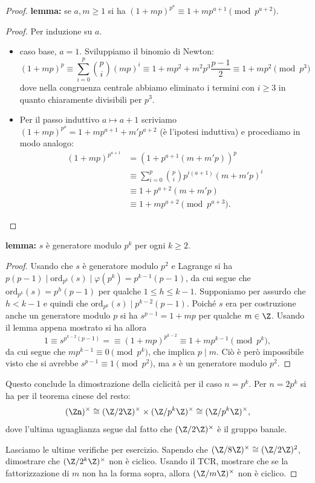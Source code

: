 \begin{proof}
    \textbf{lemma:} se $a,m \geq 1$ si ha $(1+mp)^{p^a} \equiv 1 + mp^{a+1} \pmod{p^{a+2}}$.
    \begin{proof}
        Per induzione su $a$. 
        \begin{itemize}
            \item caso base, $a=1$. Sviluppiamo il binomio di Newton:
                \[
                    (1+mp)^{p} \equiv \sum_{i=0}^{p} \binom{p}{i}(mp)^i \equiv 1 + mp^2 + m^2p^3 \frac{p-1}{2} \equiv 1 + mp^2 \pmod{p^3}
                \]
                dove nella congruenza centrale abbiamo eliminato i termini con $i \geq 3$ in quanto chiaramente divisibili per $p^3$.
            \item Per il passo induttivo $a \mapsto a+1$ scriviamo $(1+mp)^{p^a} = 1 + mp^{a+1} + m' p^{a+2}$ (è l'ipotesi induttiva) e procediamo in modo analogo:
            \begin{align*}
                (1+mp)^{p^{a+1}} &= (1 + p^{a+1}(m+m'p))^p \\
                &\equiv \sum_{i=0}^{p} \binom{p}{i} p^{i(a+1)}(m+m'p)^i \\
                &\equiv 1 + p^{a+2}(m+m'p) \\
                &\equiv 1 + mp^{a+2} \pmod{p^{a+3}}.
            \end{align*}
        \end{itemize}
    \end{proof}
    \textbf{lemma:} $s$ è generatore modulo $p^k$ per ogni $k \geq 2$.
    \begin{proof}
        Usando che $s$ è generatore modulo $p^2$ e Lagrange si ha $p(p-1)  \mid  \text{ord}_{p^k}(s)  \mid  \varphi(p^k) = p^{k-1}(p-1)$, da cui segue che $\text{ord}_{p^k}(s) = p^h(p-1)$ per qualche $1 \leq h \leq k-1$. Supponiamo per assurdo che $h < k-1$ e quindi che $\text{ord}_{p^k}(s)  \mid  p^{k-2}(p-1)$. Poiché $s$ era per costruzione anche un generatore modulo $p$ si ha $s^{p-1} = 1 + mp $ per qualche $m \in \Z$. Usando il lemma appena mostrato si ha allora \[ 1 \equiv s^{p^{k-2}(p-1)} =\equiv (1 + mp)^{p^{k-2}} \equiv 1 + mp^{k-1} \pmod{p^k}, \]
        da cui segue che $ mp^{k-1} \equiv 0\pmod{p^k}$, che implica $p  \mid  m$. Ciò è però impossibile visto che si avrebbe $s^{p-1} \equiv 1 \pmod{p^2}$, ma $s$ è un generatore modulo $p^2$. 
    \end{proof}
    Questo conclude la dimostrazione della ciclicità per il caso $n = p^k$. Per $n = 2p^k$ si ha per il teorema cinese del resto: \[(\Zn)^\times \cong (\Z/2\Z)^\times \times (\Z/p^k\Z)^\times \cong (\Z/p^k\Z)^\times,\]
    dove l'ultima uguaglianza segue dal fatto che $(\Z/2\Z)^\times$ è il gruppo banale.

    Lasciamo le ultime verifiche per esercizio. Sapendo che $(\Z/8\Z)^\times \cong (\Z/2\Z)^2$, dimostrare che $(\Z/2^k\Z)^\times$ non è ciclico. Usando il TCR, mostrare che se la fattorizzazione di $m$ non ha la forma sopra, allora $(\Z/m\Z)^\times$ non è ciclico.
\end{proof}



